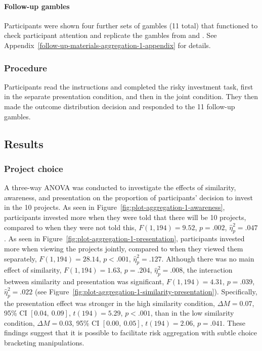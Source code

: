 \documentclass[a4paper, nobind, dvipsnames]{templates/ociamthesis}
\theoremstyle{definition}
\theoremstyle{definition}
\theoremstyle{definition}
\theoremstyle{definition}
\theoremstyle{remark}
\begin{document}
\paragraph{Follow-up gambles}

Participants were shown four further sets of gambles (11 total) that functioned
to check participant attention and replicate the gambles from \textcite{samuelson1963} and
\textcite{redelmeier1992}. See Appendix~\ref{follow-up-materials-aggregation-1-appendix}
for details.

\subsubsection{Procedure}

Participants read the instructions and completed the risky investment task,
first in the separate presentation condition, and then in the joint condition.
They then made the outcome distribution decision and responded to the 11
follow-up gambles.

\hypertarget{results-aggregation-1}{%
\subsection{Results}\label{results-aggregation-1}}

\subsubsection{Project choice}

A three-way ANOVA was conducted to investigate the effects of similarity,
awareness, and presentation on the proportion of participants' decision to
invest in the 10 projects. As seen in
Figure~\ref{fig:plot-aggregation-1-awareness}, participants invested more when
they were told that there will be 10 projects, compared to when they were not
told this, \(F(1, 194) = 9.52\), \(p = .002\), \(\hat{\eta}^2_p = .047\). As seen in
Figure~\ref{fig:plot-aggregation-1-presentation}, participants invested more
when viewing the projects jointly, compared to when they viewed them separately,
\(F(1, 194) = 28.14\), \(p < .001\), \(\hat{\eta}^2_p = .127\). Although there was no main effect of
similarity, \(F(1, 194) = 1.63\), \(p = .204\), \(\hat{\eta}^2_p = .008\), the interaction between
similarity and presentation was significant,
\(F(1, 194) = 4.31\), \(p = .039\), \(\hat{\eta}^2_p = .022\) (see
Figure~\ref{fig:plot-aggregation-1-similarity-presentation}). Specifically, the
presentation effect was stronger in the high similarity condition,
\(\Delta M = 0.07\), 95\% CI \([0.04,~0.09]\), \(t(194) = 5.29\), \(p < .001\), than in the low similarity
condition, \(\Delta M = 0.03\), 95\% CI \([0.00,~0.05]\), \(t(194) = 2.06\), \(p = .041\). These findings
suggest that it is possible to facilitate risk aggregation with subtle choice
bracketing manipulations.
\end{document}
